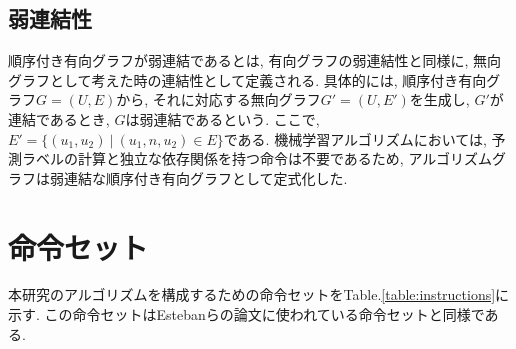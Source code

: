 \documentclass[11pt,oneside,openany,report]{jsbook}
\begin{document}
\section{弱連結性}
順序付き有向グラフが弱連結であるとは, 有向グラフの弱連結性と同様に, 無向グラフとして考えた時の連結性として定義される. 具体的には, 順序付き有向グラフ$G = (U, E)$から, それに対応する無向グラフ$G' = (U, E')$を生成し, $G'$が連結であるとき, $G$は弱連結であるという. ここで, $E' = \{(u_1, u_2)\ |\ (u_1, n, u_2) \in E\}$である. 機械学習アルゴリズムにおいては, 予測ラベルの計算と独立な依存関係を持つ命令は不要であるため, アルゴリズムグラフは弱連結な順序付き有向グラフとして定式化した.

\chapter{命令セット} \label{chap:ops}

本研究のアルゴリズムを構成するための命令セットをTable.\ref{table:instructions}に示す. この命令セットはEstebanらの論文\cite{automl_zero}に使われている命令セットと同様である.
\end{document}
